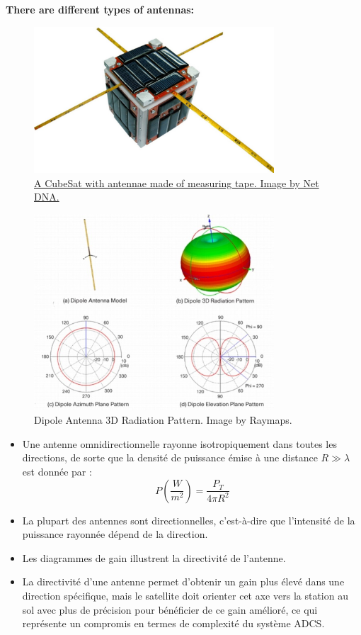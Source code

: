 \textbf{There are different types of antennas:}

\begin{figure}[H]
    \centering
    \includegraphics[width=0.8\textwidth]{figures/6-68.jpg}
    \caption{\href{https://phys.org/news/2022-09-team-amateurs-built-satellite-nasa.html}{A CubeSat with antennae made of measuring tape. Image by Net DNA.}}
    \label{fig:communication5}
\end{figure}

\begin{figure}[H]
    \centering
    \includegraphics[width=0.8\textwidth]{figures/6-69.jpg}
    \caption{Dipole Antenna 3D Radiation Pattern. Image by Raymaps.}
    \label{fig:communication6}
\end{figure}

\begin{itemize}
    \item Une antenne omnidirectionnelle rayonne isotropiquement dans toutes les directions, de sorte que la densit\'e de puissance \'emise \`a une distance \( R \gg \lambda \) est donn\'ee par :
    \[ P\left(\frac{W}{m^2}\right) = \frac{P_T}{4\pi R^2} \]
    \item La plupart des antennes sont directionnelles, c'est-\`a-dire que l'intensit\'e de la puissance rayonn\'ee d\'epend de la direction.
    \item Les diagrammes de gain illustrent la directivit\'e de l'antenne.
    \item La directivit\'e d'une antenne permet d'obtenir un gain plus \'elev\'e dans une direction sp\'ecifique, mais le satellite doit orienter cet axe vers la station au sol avec plus de pr\'ecision pour b\'en\'eficier de ce gain am\'elior\'e, ce qui repr\'esente un compromis en termes de complexit\'e du syst\`eme ADCS.
\end{itemize}

